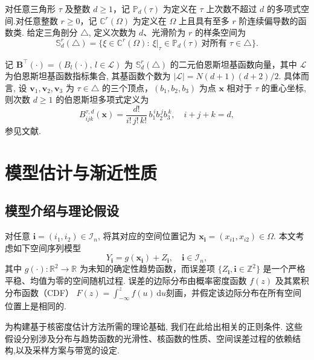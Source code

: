 \documentclass[a4paper,openay,14pt]{ctexbook}
\numberwithin{equation}{section}
\numberwithin{lem}{section}
\newcommand{\chapterwithfancyheader}[1]{  
    \chapter{#1} %
    \thispagestyle{fancy} %
}
\begin{document}
对任意三角形 $\tau$ 及整数 $d\ge 1$，记 $\mathbb{P}_d(\tau)$ 为定义在 $\tau$ 上次数不超过 $d$ 的多项式空间.对任意整数 $r\ge 0$，记 $\mathbb{C}^{r}(\Omega)$ 为定义在 $\Omega$ 上且具有至多 $r$ 阶连续偏导数的函数类. 给定三角剖分 $\triangle$, 定义次数为 $d$、光滑阶为 $r$ 的样条空间为
\begin{equation}\label{DEF:S_rd}
  \mathbb{S}_{d}^{r}(\triangle)
  = \bigl\{\xi\in \mathbb{C}^{r}(\Omega): \ \xi|_{\tau}\in \mathbb{P}_d(\tau)\ \text{对所有 } \tau\in\triangle \bigr\}.
\end{equation}

记 $\mathbf{B}^\top(\boldsymbol{\cdot})=\left(B_{l}(\boldsymbol{\cdot}),\,l\in\mathcal{L}\right)$ 为 $\mathbb{S}_{d}^{r}(\triangle)$ 的二元伯恩斯坦基函数向量，其中 $\mathcal{L}$ 为伯恩斯坦基函数指标集合, 其基函数个数为
$|\mathcal{L}|=N(d+1)(d+2)/2$.
具体而言, 设 $\mathbf{v}_1,\mathbf{v}_2,\mathbf{v}_3$ 为 $\tau\in\triangle$ 的三个顶点，$(b_1,b_2,b_3)$ 为点 $\boldsymbol{x}$ 相对于 $\tau$ 的重心坐标, 则次数 $d\ge 1$ 的伯恩斯坦多项式定义为
\[
B^{\tau,d}_{ijk}(\boldsymbol{x})
=\frac{d!}{i!\,j!\,k!}\,b_1^{\,i} b_2^{\,j} b_3^{\,k},
\quad i+j+k=d,
\]
参见文献\cite{lai2007spline}. 


\chapterwithfancyheader{模型估计与渐近性质}\label{SEC: result}
\section{模型介绍与理论假设}
对任意 \(\mathbf{i} = (i_1, i_2) \in \mathcal{I}_n\), 将其对应的空间位置记为 \(\boldsymbol{x}_{\mathbf{i}} = (x_{i1}, x_{i2}) \in \Omega\). 本文考虑如下空间序列模型
\begin{equation}\label{model:nonparbiregression}
   Y_{\mathbf{i}} = g(\boldsymbol{x}_{\mathbf{i}}) + Z_{\mathbf{i}}, 
   \quad \mathbf{i} \in \mathcal{I}_n,
\end{equation}
其中 \( g(\cdot): \mathbb{R}^2 \to \mathbb{R} \) 为未知的确定性趋势函数，而误差项
\(\{Z_{\mathbf{i}}, \mathbf{i} \in \mathbb{Z}^2\}\) 是一个严格平稳、均值为零的空间随机过程. 误差的边际分布由概率密度函数 \( f(z) \) 及其累积分布函数（CDF）
\(F(z) = \int_{-\infty}^{z} f(u)\,\mathrm{d}u\)刻画，并假定该边际分布在所有空间位置上是相同的.

为构建基于核密度估计方法所需的理论基础, 我们在此给出相关的正则条件. 这些假设分别涉及分布与趋势函数的光滑性、核函数的性质、空间误差过程的依赖结构,以及采样方案与带宽的设定.
\end{document}
